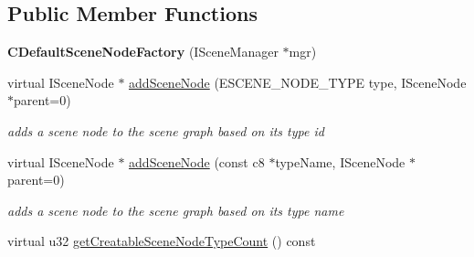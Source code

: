 \subsection*{Public Member Functions}
\begin{DoxyCompactItemize}
\item 
\hypertarget{classirr_1_1scene_1_1_c_default_scene_node_factory_a30fde445d30a76e86cf58139a6ca5fe3}{{\bfseries C\-Default\-Scene\-Node\-Factory} (I\-Scene\-Manager $\ast$mgr)}\label{classirr_1_1scene_1_1_c_default_scene_node_factory_a30fde445d30a76e86cf58139a6ca5fe3}

\item 
virtual I\-Scene\-Node $\ast$ \hyperlink{classirr_1_1scene_1_1_c_default_scene_node_factory_a263f148ce19c1ac4a15ac29b46ed8aa5}{add\-Scene\-Node} (E\-S\-C\-E\-N\-E\-\_\-\-N\-O\-D\-E\-\_\-\-T\-Y\-P\-E type, I\-Scene\-Node $\ast$parent=0)
\begin{DoxyCompactList}\small\item\em adds a scene node to the scene graph based on its type id \end{DoxyCompactList}\item 
virtual I\-Scene\-Node $\ast$ \hyperlink{classirr_1_1scene_1_1_c_default_scene_node_factory_ab89415be57792fb5bea914784f0830b1}{add\-Scene\-Node} (const c8 $\ast$type\-Name, I\-Scene\-Node $\ast$parent=0)
\begin{DoxyCompactList}\small\item\em adds a scene node to the scene graph based on its type name \end{DoxyCompactList}\item 
\hypertarget{classirr_1_1scene_1_1_c_default_scene_node_factory_a5d21ba09c950be321932eb3abf77558b}{virtual u32 \hyperlink{classirr_1_1scene_1_1_c_default_scene_node_factory_a5d21ba09c950be321932eb3abf77558b}{get\-Creatable\-Scene\-Node\-Type\-Count} () const }\label{classirr_1_1scene_1_1_c_default_scene_node_factory_a5d21ba09c950be321932eb3abf77558b}


\end{DoxyCompactItemize}
